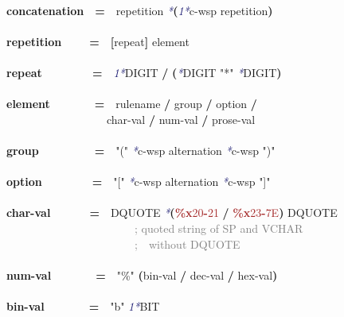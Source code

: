 \documentclass{article}
\begin{document}
{\\
\textbf{concatenation}\mbox{~~}\textbf{=}\mbox{~~}repetition \textcolor{MidnightBlue}{\emph{*}}\textbf{(}\textcolor{MidnightBlue}{\emph{1*}}c-{}wsp repetition\textbf{)}\\
\\
\textbf{repetition}\mbox{~~~~~}\textbf{=}\mbox{~~}\textbf{[}repeat\textbf{]} element\\
\\
\textbf{repeat}\mbox{~~~~~~~~~}\textbf{=}\mbox{~~}\textcolor{MidnightBlue}{\emph{1*}}DIGIT \textbf{/} \textbf{(}\textcolor{MidnightBlue}{\emph{*}}DIGIT \textcolor{BrickRed}{"*"} \textcolor{MidnightBlue}{\emph{*}}DIGIT\textbf{)}\\
\\
\textbf{element}\mbox{~~~~~~~~}\textbf{=}\mbox{~~}rulename \textbf{/} group \textbf{/} option \textbf{/}\\
\mbox{~~~~~~~~~~~~~~~~~~}char-{}val \textbf{/} num-{}val \textbf{/} prose-{}val\\
\\
\textbf{group}\mbox{~~~~~~~~~~}\textbf{=}\mbox{~~}\textcolor{BrickRed}{"("} \textcolor{MidnightBlue}{\emph{*}}c-{}wsp alternation \textcolor{MidnightBlue}{\emph{*}}c-{}wsp \textcolor{BrickRed}{")"}\\
\\
\textbf{option}\mbox{~~~~~~~~~}\textbf{=}\mbox{~~}\textcolor{BrickRed}{"["} \textcolor{MidnightBlue}{\emph{*}}c-{}wsp alternation \textcolor{MidnightBlue}{\emph{*}}c-{}wsp \textcolor{BrickRed}{"]"}\\
\\
\textbf{char-{}val}\mbox{~~~~~~~}\textbf{=}\mbox{~~}DQUOTE \textcolor{MidnightBlue}{\emph{*}}\textbf{(}\textcolor{Brown}{\textbf{\%{}x}20\textbf{-}21} \textbf{/} \textcolor{Brown}{\textbf{\%{}x}23\textbf{-}7E}\textbf{)} DQUOTE\\
\mbox{~~~~~~~~~~~~~~~~~~~~~~~}\textcolor{Gray}{; quoted string of SP and VCHAR}\\
\mbox{~~~~~~~~~~~~~~~~~~~~~~~}\textcolor{Gray}{;\mbox{~~}without DQUOTE}\\
\\
\textbf{num-{}val}\mbox{~~~~~~~~}\textbf{=}\mbox{~~}\textcolor{BrickRed}{"\%{}"} \textbf{(}bin-{}val \textbf{/} dec-{}val \textbf{/} hex-{}val\textbf{)}\\
\\
\textbf{bin-{}val}\mbox{~~~~~~~~}\textbf{=}\mbox{~~}\textcolor{BrickRed}{"b"} \textcolor{MidnightBlue}{\emph{1*}}BIT\\
}
\end{document}
